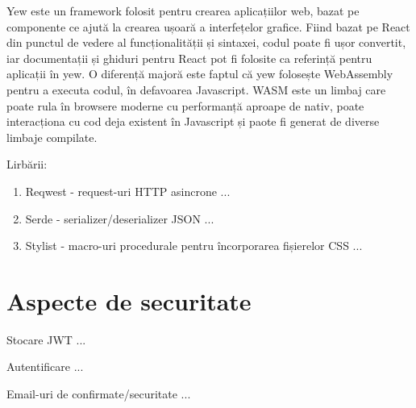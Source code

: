     Yew este un framework folosit pentru crearea aplicațiilor web, bazat pe componente ce ajută la crearea ușoară a interfețelor grafice. Fiind bazat pe React din punctul de vedere al funcționalității și sintaxei, codul poate fi ușor convertit, iar documentații și ghiduri pentru React pot fi folosite ca referință pentru aplicații în yew. O diferență majoră este faptul că yew folosește WebAssembly pentru a executa codul, în defavoarea Javascript. WASM este un limbaj care poate rula în browsere moderne cu performanță aproape de nativ, poate interacționa cu cod deja existent în Javascript și paote fi generat de diverse limbaje compilate.

    Lirbării:
    \begin{enumerate}[noitemsep]
        \item Reqwest - request-uri HTTP asincrone ...
        \item Serde - serializer/deserializer JSON ...
        \item Stylist - macro-uri procedurale pentru încorporarea fișierelor CSS ...
    \end{enumerate}
    
    \section{Aspecte de securitate}
    \label{Aspecte de securitate}
    Stocare JWT ...

    Autentificare ...

    Email-uri de confirmate/securitate ...
    
\newpage